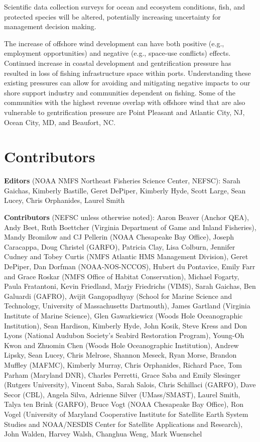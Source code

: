 \documentclass[
  10pt,
]{article}
\begin{document}
Scientific data collection surveys for ocean and ecosystem conditions,
fish, and protected species will be altered, potentially increasing
uncertainty for management decision making.

The increase of offshore wind development can have both positive (e.g.,
employment opportunities) and negative (e.g., space-use conflicts)
effects. Continued increase in coastal development and gentrification
pressure has resulted in loss of fishing infrastructure space within
ports. Understanding these existing pressures can allow for avoiding and
mitigating negative impacts to our shore support industry and
communities dependent on fishing. Some of the communities with the
highest revenue overlap with offshore wind that are also vulnerable to
gentrification pressure are Point Pleasant and Atlantic City, NJ, Ocean
City, MD, and Beaufort, NC.

\hypertarget{contributors}{%
\section{Contributors}\label{contributors}}

\textbf{Editors} (NOAA NMFS Northeast Fisheries Science Center, NEFSC):
Sarah Gaichas, Kimberly Bastille, Geret DePiper, Kimberly Hyde, Scott
Large, Sean Lucey, Chris Orphanides, Laurel Smith

\textbf{Contributors} (NEFSC unless otherwise noted): Aaron Beaver
(Anchor QEA), Andy Beet, Ruth Boettcher (Virginia Department of Game and
Inland Fisheries), Mandy Bromilow and CJ Pellerin (NOAA Chesapeake Bay
Office), Joseph Caracappa, Doug Christel (GARFO), Patricia Clay, Lisa
Colburn, Jennifer Cudney and Tobey Curtis (NMFS Atlantic HMS Management
Division), Geret DePiper, Dan Dorfman (NOAA-NOS-NCCOS), Hubert du
Pontavice, Emily Farr and Grace Roskar (NMFS Office of Habitat
Conservation), Michael Fogarty, Paula Fratantoni, Kevin Friedland, Marjy
Friedrichs (VIMS), Sarah Gaichas, Ben Galuardi (GAFRO), Avijit
Gangopadhyay (School for Marine Science and Technology, University of
Massachusetts Dartmouth), James Gartland (Virginia Institute of Marine
Science), Glen Gawarkiewicz (Woods Hole Oceanographic Institution), Sean
Hardison, Kimberly Hyde, John Kosik, Steve Kress and Don Lyons (National
Audubon Society's Seabird Restoration Program), Young-Oh Kwon and
Zhuomin Chen (Woods Hole Oceanographic Institution), Andrew Lipsky, Sean
Lucey, Chris Melrose, Shannon Meseck, Ryan Morse, Brandon Muffley
(MAFMC), Kimberly Murray, Chris Orphanides, Richard Pace, Tom Parham
(Maryland DNR), Charles Perretti, Grace Saba and Emily Slesinger
(Rutgers University), Vincent Saba, Sarah Salois, Chris Schillaci
(GARFO), Dave Secor (CBL), Angela Silva, Adrienne Silver (UMass/SMAST),
Laurel Smith, Talya ten Brink (GARFO), Bruce Vogt (NOAA Chesapeake Bay
Office), Ron Vogel (University of Maryland Cooperative Institute for
Satellite Earth System Studies and NOAA/NESDIS Center for Satellite
Applications and Research), John Walden, Harvey Walsh, Changhua Weng,
Mark Wuenschel
\end{document}
